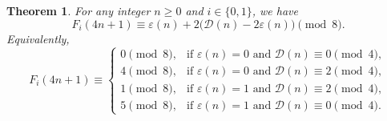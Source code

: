\documentclass[12pt]{article}
\numberwithin{equation}{section}
\newtheorem{theorem}{Theorem}[section]
\theoremstyle{definition}
\theoremstyle{remark}
\numberwithin{equation}{section}
\begin{document}
\begin{theorem}
For any integer $n\ge 0$ and  $i\in\{0,1\}$, we have 
\begin{equation}\label{fg3}
F_i(4n+1)\equiv
\varepsilon(n)+2\bigl(\mathcal{D}(n)-2\varepsilon(n)\bigr)
\pmod 8.
\end{equation}
Equivalently,
\begin{equation}\label{fg4}
F_i(4n+1)\equiv
\begin{cases}
0 \pmod 8, & \text{if } \varepsilon(n)=0 \text{ and } \mathcal{D}(n)\equiv0\pmod4,\\
4 \pmod 8, & \text{if } \varepsilon(n)=0 \text{ and } \mathcal{D}(n)\equiv2\pmod4,\\
1 \pmod 8, & \text{if } \varepsilon(n)=1 \text{ and } \mathcal{D}(n)\equiv2\pmod4,\\
5 \pmod 8, & \text{if } \varepsilon(n)=1 \text{ and } \mathcal{D}(n)\equiv0\pmod4.
\end{cases}
\end{equation}
\end{theorem}
\end{document}
